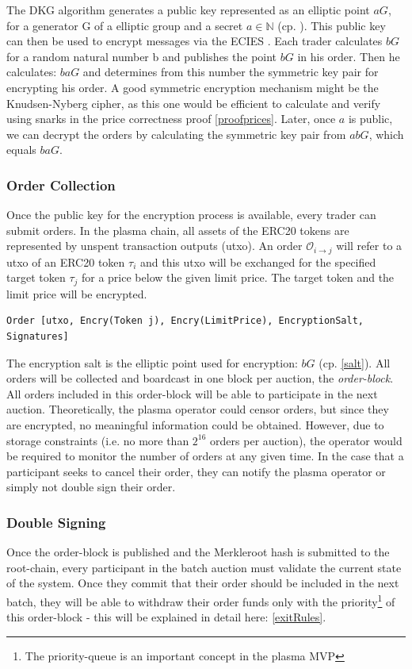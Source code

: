 \documentclass[11pt,parskip=full]{scrartcl}%
\def\pO{\mathcal{O}}
\def\ra{\rightarrow}
\newcommand*{\erc}{ERC20 }
\begin{document}
The DKG algorithm generates a public key represented as an elliptic point $aG\label{public key}$, for a generator G of a elliptic group and a secret $a\in \mathbb{N}$ (cp. \cite{DKG}). 
This public key can then be used to encrypt messages via the ECIES \cite{ECIES}. 
Each trader calculates $bG \label{salt}$ for a random natural number b and publishes the point $bG$  in his order. 
Then he calculates: $baG$ and determines from this number the symmetric key pair for encrypting his order. 
A good symmetric encryption mechanism might be the Knudsen-Nyberg cipher\cite{cipher}, as this one would be efficient to calculate and verify using snarks in the price correctness proof \ref{proofprices}.
Later, once $a$ is public, we can decrypt the orders by calculating the symmetric key pair from $abG$, which equals $baG$. 


\subsubsection{Order Collection}
\label{orderblock}
Once the public key for the encryption process is available, every trader can submit orders. 
In the plasma chain, all assets of the ERC20 tokens are represented by unspent transaction outputs (utxo). 
An order $\pO_{i\ra j}$ will refer to a utxo of an \erc token $\tau_i$ and this utxo will be exchanged for the specified target token $\tau_j$ for a price below the given limit price. The target token and the limit price will be encrypted.

\begin{verbatim}
Order [utxo, Encry(Token j), Encry(LimitPrice), EncryptionSalt, Signatures]
\end{verbatim} 

The encryption salt is the elliptic point used for encryption:  $bG$ (cp. \ref{salt}). 
All orders will be collected and boardcast in one block per auction, the \emph{order-block}. 
All orders included in this order-block will be able to participate in the next auction. 
Theoretically, the plasma operator could censor orders, but since they are encrypted, no meaningful information could be obtained.
However, due to storage constraints (i.e. no more than $2^{16}$ orders per auction), the operator would be required to monitor the number of orders at any given time.
In the case that a participant seeks to cancel their order, they can notify the plasma operator or simply not double sign their order. 

\subsubsection{Double Signing}
Once the order-block is published and the Merkleroot hash is submitted to the root-chain, every participant in the batch auction must validate the current state of the system. 
Once they commit that their order should be included in the next batch, they will be able to withdraw their order funds only with the priority\footnote{The priority-queue is an important concept in the plasma MVP} of this order-block - this will be explained in detail here: \ref{exitRules}.
\end{document}
